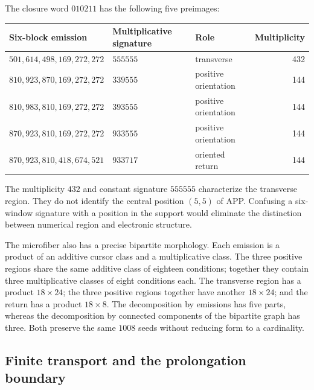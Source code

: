The closure word \(010211\) has the following five preimages:
\begin{center}\small
\begin{tabular}{@{}lll r@{}}\toprule
Six-block emission&Multiplicative signature&Role&Multiplicity\\\midrule
\(501,614,498,169,272,272\)&\(555555\)&transverse&432\\
\(810,923,870,169,272,272\)&\(339555\)&positive orientation&144\\
\(810,983,810,169,272,272\)&\(393555\)&positive orientation&144\\
\(870,923,810,169,272,272\)&\(933555\)&positive orientation&144\\
\(870,923,810,418,674,521\)&\(933717\)&oriented return&144\\\bottomrule
\end{tabular}
\end{center}
The multiplicity \(432\) and constant signature \(555555\) characterize the transverse region. They do not identify the central position \((5,5)\) of APP. Confusing a six-window signature with a position in the support would eliminate the distinction between numerical region and electronic structure.

The microfiber also has a precise bipartite morphology. Each emission is a product of an additive cursor class and a multiplicative class. The three positive regions share the same additive class of eighteen conditions; together they contain three multiplicative classes of eight conditions each. The transverse region has a product \(18\times24\); the three positive regions together have another \(18\times24\); and the return has a product \(18\times8\). The decomposition by emissions has five parts, whereas the decomposition by connected components of the bipartite graph has three. Both preserve the same \(1008\) seeds without reducing form to a cardinality.

\subsection{Finite transport and the prolongation boundary}

